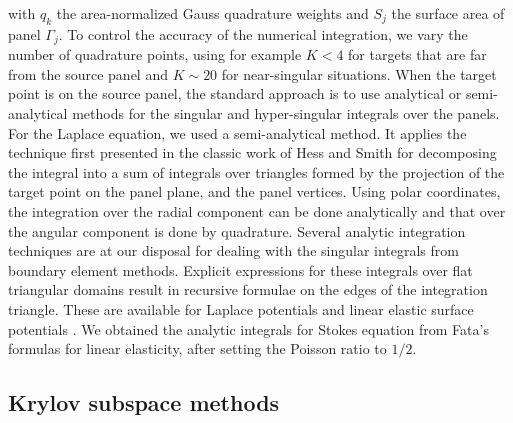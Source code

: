 \documentclass[final,leqno,]{siamltex1213}
\begin{document}
\noindent
with $q_k$ the area-normalized Gauss quadrature weights and $S_j$ the surface area of panel $\Gamma_j$. To control the accuracy of the numerical integration, we vary the number of quadrature points, using for example $K< 4$ for targets that are far from the source panel and $K\sim 20$ for near-singular situations. 
When the target point is on the source panel, the standard approach is to use analytical or semi-analytical methods for the singular and hyper-singular integrals over the panels.
For the Laplace equation, we used a semi-analytical method. 
It applies the technique first presented in the classic work of Hess and Smith \cite[p.~49, ff.]{HessSmith1967} for decomposing the integral into a sum of integrals over triangles formed by the projection of the target point on the panel plane, and the panel vertices. Using polar coordinates, the integration over the radial component can be done analytically and that over the angular component is done by quadrature. %
Several analytic integration techniques are at our disposal for dealing with the singular integrals from boundary element methods. Explicit expressions for these integrals over flat triangular domains result in recursive formulae on the edges of the integration triangle. These are available for Laplace potentials \cite{Fata2009} and linear elastic surface potentials \cite{Fata2011}. 
We obtained the analytic integrals for Stokes equation from Fata's formulas for linear elasticity, after setting the Poisson ratio to $1/2$. 

\subsection{Krylov subspace methods}
\end{document}
